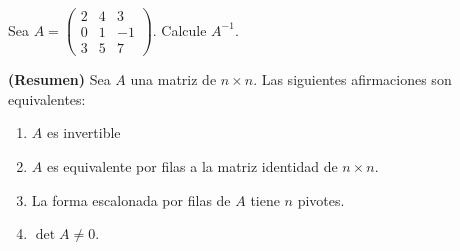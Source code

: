 \begin{ejem}
Sea $A =  \begin{pmatrix} 2 & 4 & 3 \\ 0 & 1 & -1 \\ 3 & 5 & 7 \end{pmatrix}$. Calcule $A^{-1}$.
\end{ejem}



\begin{thm}
\textbf{(Resumen)} Sea $A$ una matriz de $n \times n$. Las siguientes afirmaciones son equivalentes:

\begin{enumerate}
\item
$A$ es invertible


\item
$A$ es equivalente por filas a la matriz identidad de $n \times n$.

\item
La forma escalonada por filas de $A$ tiene $n$ pivotes.

\item
$\det A \not = 0$.
\end{enumerate}
\end{thm}


